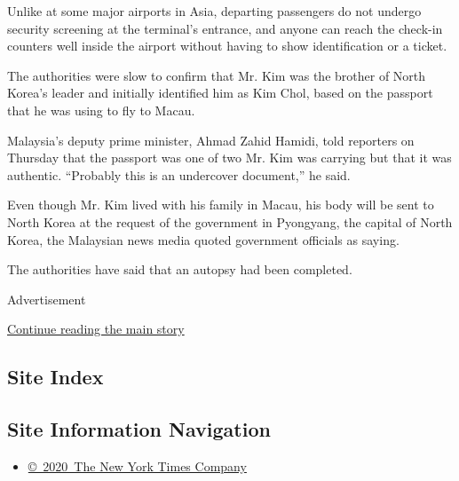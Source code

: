 Unlike at some major airports in Asia, departing passengers do not
undergo security screening at the terminal's entrance, and anyone can
reach the check-in counters well inside the airport without having to
show identification or a ticket.

The authorities were slow to confirm that Mr. Kim was the brother of
North Korea's leader and initially identified him as Kim Chol, based on
the passport that he was using to fly to Macau.

Malaysia's deputy prime minister, Ahmad Zahid Hamidi, told reporters on
Thursday that the passport was one of two Mr. Kim was carrying but that
it was authentic. ``Probably this is an undercover document,'' he said.

Even though Mr. Kim lived with his family in Macau, his body will be
sent to North Korea at the request of the government in Pyongyang, the
capital of North Korea, the Malaysian news media quoted government
officials as saying.

The authorities have said that an autopsy had been completed.

Advertisement

\protect\hyperlink{after-bottom}{Continue reading the main story}

\hypertarget{site-index}{%
\subsection{Site Index}\label{site-index}}

\hypertarget{site-information-navigation}{%
\subsection{Site Information
Navigation}\label{site-information-navigation}}

\begin{itemize}
\tightlist
\item
  \href{https://help.nytimes.com/hc/en-us/articles/115014792127-Copyright-notice}{©~2020~The
  New York Times Company}
\end{itemize}

